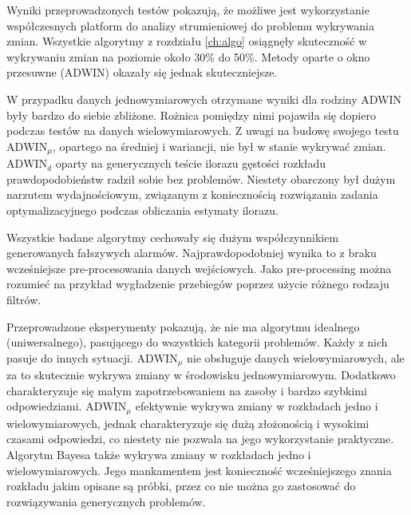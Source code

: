 Wyniki przeprowadzonych testów pokazują,
że możliwe jest wykorzystanie współczesnych platform do analizy strumieniowej
do problemu wykrywania zmian.
Wszystkie algorytmy z rozdziału \ref{ch:algo} osiągnęły skuteczność w wykrywaniu zmian
na poziomie około 30\% do 50\%.
Metody oparte o okno przesuwne (ADWIN) okazały się jednak skuteczniejsze.

W przypadku danych jednowymiarowych otrzymane wyniki dla rodziny ADWIN były bardzo do siebie zbliżone.
Rożnica pomiędzy nimi pojawiła się dopiero podczas testów na danych wielowymiarowych.
Z uwagi na budowę swojego testu $\mbox{ADWIN}_\mu$, opartego na średniej i wariancji,
nie był w stanie wykrywać zmian.
$\mbox{ADWIN}_d$ oparty na generycznych teście ilorazu gęstości rozkładu prawdopodobieństw radził sobie bez problemów.
Niestety obarczony był dużym narzutem wydajnościowym,
związanym z koniecznością rozwiązania zadania optymalizacyjnego podczas obliczania estymaty ilorazu.

Wszystkie badane algorytmy cechowały się dużym współczynnikiem generowanych fałszywych alarmów.
Najprawdopodobniej wynika to z braku wcześniejsze pre-procesowania danych wejściowych.
Jako pre-processing można rozumieć na przykład wygładzenie przebiegów poprzez użycie różnego rodzaju filtrów.

Przeprowadzone eksperymenty pokazują,
że nie ma algorytmu idealnego (uniwersalnego),
pasującego do wszystkich kategorii problemów.
Każdy z nich pasuje do innych sytuacji.
$\mbox{ADWIN}_\mu$ nie obsługuje danych wielowymiarowych,
ale za to skutecznie wykrywa zmiany w środowisku jednowymiarowym.
Dodatkowo charakteryzuje się małym zapotrzebowaniem na zasoby i bardzo szybkimi odpowiedziami.
$\mbox{ADWIN}_\mu$ efektywnie wykrywa zmiany w rozkładach jedno i wielowymiarowych,
jednak charakteryzuje się dużą złożonością i wysokimi czasami odpowiedzi,
co niestety nie pozwala na jego wykorzystanie praktyczne.
Algorytm Bayesa także wykrywa zmiany w rozkładach jedno i wielowymiarowych.
Jego mankamentem jest konieczność wcześniejszego znania rozkładu jakim opisane są próbki,
przez co nie można go zastosować do rozwiązywania generycznych problemów.
